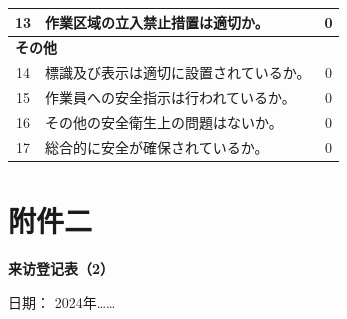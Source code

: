 \documentclass[UTF8,10pt,a4paper,fontset=fandol]{ctexart}
\newcommand{\fieldvalue}[1]{#1}
\newcommand{\handwritten}[1]{#1}
\begin{document}
\begin{tabularx}{\textwidth}{|c|X|c|}
\hline
13 & 作業区域の立入禁止措置は適切か。 &
\fieldvalue{\handwritten{0}}\\
\hline
\multicolumn{3}{|l|}{\textbf{その他}}\\
\hline
14 & 標識及び表示は適切に設置されているか。 &
\fieldvalue{\handwritten{0}}\\
\hline
15 & 作業員への安全指示は行われているか。 &
\fieldvalue{\handwritten{0}}\\
\hline
16 & その他の安全衛生上の問題はないか。 &
\fieldvalue{\handwritten{0}}\\
\hline
17 & 総合的に安全が確保されているか。 &
\fieldvalue{\handwritten{0}}\\
\hline
\end{tabularx}


\newpage

\section*{附件二}

\begin{center}
\textbf{来访登记表（2）}
\end{center}


\noindent
日期：
\fieldvalue{\handwritten{2024年……}}

\vspace{0.5em}
\end{document}
